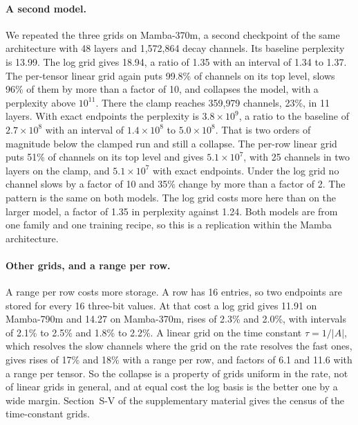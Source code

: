 \documentclass[journal]{IEEEtran}
\begin{document}
\paragraph{A second model.} We repeated the three grids on Mamba-370m, a second checkpoint of
the same architecture with 48 layers and 1{,}572{,}864 decay channels. Its baseline perplexity is
13.99. The log grid gives 18.94, a ratio of 1.35 with an interval of 1.34 to 1.37. The per-tensor linear grid again puts 99.8\% of channels on its
top level, slows 96\% of them by more than a factor of 10, and collapses the model, with a
perplexity above $10^{11}$. There the clamp reaches 359{,}979 channels, 23\%, in 11 layers. With exact endpoints the
perplexity is $3.8\times10^{9}$, a ratio to the baseline of $2.7\times10^{8}$ with
an interval of $1.4\times10^{8}$ to $5.0\times10^{8}$. That is two orders of
magnitude below the clamped run and still a collapse. The per-row linear grid
puts 51\% of channels on its top level and
gives $5.1\times10^{7}$, with 25 channels in two layers on the clamp, and $5.1\times10^{7}$ with
exact endpoints. Under the log grid no channel slows by a factor of 10 and 35\% change by
more than a factor of 2. The pattern is the same on both models. The log grid costs more here
than on the larger model, a factor of 1.35 in perplexity against 1.24. Both models are from one
family and one training recipe, so this is a replication within the Mamba architecture.

\paragraph{Other grids, and a range per row.} A range per row costs more storage. A row has
16 entries, so two endpoints are stored for every 16 three-bit values. At that cost a log grid
gives 11.91 on Mamba-790m and 14.27 on Mamba-370m, rises of 2.3\% and 2.0\%, with intervals of
2.1\% to 2.5\% and 1.8\% to 2.2\%. A linear grid on the time constant $\tau = 1/|A|$, which
resolves the slow channels where the grid on the rate resolves the fast ones, gives rises of 17\%
and 18\% with a range per row, and factors of 6.1 and 11.6 with a range per tensor. So the
collapse is a property of grids uniform in the rate, not of linear grids in general, and at equal
cost the log basis is the better one by a wide margin. Section~S-V of the supplementary material
gives the census of the time-constant grids.
\end{document}
